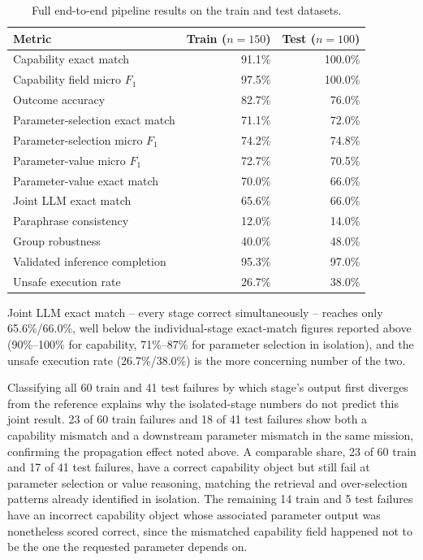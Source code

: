 \begin{table}[H]
\centering
\caption{Full end-to-end pipeline results on the train and test datasets.}
\label{tab:full-pipeline-results}
\begin{tabular}{lrr}
\toprule
Metric & Train ($n=150$) & Test ($n=100$) \\
\midrule
Capability exact match & 91.1\% & 100.0\% \\
Capability field micro $F_1$ & 97.5\% & 100.0\% \\
Outcome accuracy & 82.7\% & 76.0\% \\
Parameter-selection exact match & 71.1\% & 72.0\% \\
Parameter-selection micro $F_1$ & 74.2\% & 74.8\% \\
Parameter-value micro $F_1$ & 72.7\% & 70.5\% \\
Parameter-value exact match & 70.0\% & 66.0\% \\
Joint LLM exact match & 65.6\% & 66.0\% \\
Paraphrase consistency & 12.0\% & 14.0\% \\
Group robustness & 40.0\% & 48.0\% \\
Validated inference completion & 95.3\% & 97.0\% \\
Unsafe execution rate & 26.7\% & 38.0\% \\
\bottomrule
\end{tabular}
\end{table}

Joint LLM exact match -- every stage correct simultaneously -- reaches only 65.6\%/66.0\%, well below the individual-stage exact-match figures reported above (90\%--100\% for capability, 71\%--87\% for parameter selection in isolation), and the unsafe execution rate (26.7\%/38.0\%) is the more concerning number of the two.

Classifying all 60 train and 41 test failures by which stage's output first diverges from the reference explains why the isolated-stage numbers do not predict this joint result. 23 of 60 train failures and 18 of 41 test failures show both a capability mismatch and a downstream parameter mismatch in the same mission, confirming the propagation effect noted above. A comparable share, 23 of 60 train and 17 of 41 test failures, have a correct capability object but still fail at parameter selection or value reasoning, matching the retrieval and over-selection patterns already identified in isolation. The remaining 14 train and 5 test failures have an incorrect capability object whose associated parameter output was nonetheless scored correct, since the mismatched capability field happened not to be the one the requested parameter depends on.

